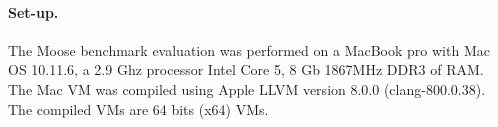 \documentclass[10pt, sigplan]{acmart}
\begin{document}
\paragraph{Set-up.}The Moose benchmark evaluation was performed on a MacBook pro with Mac OS 10.11.6, a 2.9 Ghz processor Intel Core 5, 8 Gb 1867MHz DDR3 of RAM. The Mac VM was compiled using Apple LLVM version 8.0.0 (clang-800.0.38). The compiled VMs are 64 bits (x64) VMs.

\end{document}
